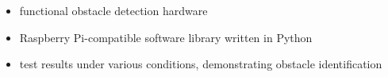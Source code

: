 \begin{itemize}
\item functional obstacle detection hardware
\item Raspberry Pi-compatible software library written in Python
\item test results under various conditions, demonstrating obstacle identification
\end{itemize}
